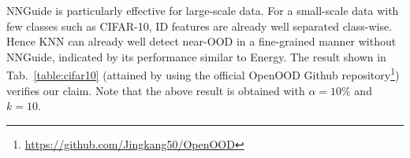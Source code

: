 \documentclass[10pt,twocolumn,letterpaper]{article}
\begin{document}
NNGuide is particularly effective for large-scale data. For a small-scale data with few classes such as CIFAR-10, ID features are already well separated class-wise. Hence KNN can already well detect near-OOD in a fine-grained manner without NNGuide, indicated by its performance similar to Energy. 
The result shown in Tab.~\ref{table:cifar10} (attained by using the official OpenOOD Github repository\footnote{\url{https://github.com/Jingkang50/OpenOOD}}) verifies our claim.
Note that the above result is obtained with $\alpha = 10\%$ and $k=10$.





\clearpage
\twocolumn
\end{document}
